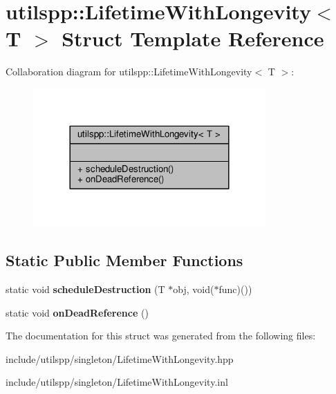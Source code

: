 \hypertarget{structutilspp_1_1LifetimeWithLongevity}{\section{utilspp\-:\-:Lifetime\-With\-Longevity$<$ T $>$ Struct Template Reference}
\label{structutilspp_1_1LifetimeWithLongevity}
}


Collaboration diagram for utilspp\-:\-:Lifetime\-With\-Longevity$<$ T $>$\-:
\nopagebreak
\begin{figure}[H]
\begin{center}
\leavevmode
\includegraphics[width=252pt]{structutilspp_1_1LifetimeWithLongevity__coll__graph}
\end{center}
\end{figure}
\subsection*{Static Public Member Functions}
\begin{DoxyCompactItemize}
\item 
\hypertarget{structutilspp_1_1LifetimeWithLongevity_ac6e28f31469a388a34557bcda52294b2}{static void {\bfseries schedule\-Destruction} (T $\ast$obj, void($\ast$func)())}\label{structutilspp_1_1LifetimeWithLongevity_ac6e28f31469a388a34557bcda52294b2}

\item 
\hypertarget{structutilspp_1_1LifetimeWithLongevity_a1d32c3987ba16999fbc981ae4947c7ac}{static void {\bfseries on\-Dead\-Reference} ()}\label{structutilspp_1_1LifetimeWithLongevity_a1d32c3987ba16999fbc981ae4947c7ac}

\end{DoxyCompactItemize}


The documentation for this struct was generated from the following files\-:\begin{DoxyCompactItemize}
\item 
include/utilspp/singleton/Lifetime\-With\-Longevity.\-hpp\item 
include/utilspp/singleton/Lifetime\-With\-Longevity.\-inl\end{DoxyCompactItemize}
